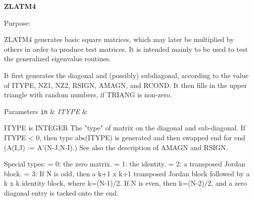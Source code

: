 {\bfseries Z\+L\+A\+T\+M4} 

\begin{DoxyParagraph}{Purpose\+: }
\begin{DoxyVerb} ZLATM4 generates basic square matrices, which may later be
 multiplied by others in order to produce test matrices.  It is
 intended mainly to be used to test the generalized eigenvalue
 routines.

 It first generates the diagonal and (possibly) subdiagonal,
 according to the value of ITYPE, NZ1, NZ2, RSIGN, AMAGN, and RCOND.
 It then fills in the upper triangle with random numbers, if TRIANG is
 non-zero.\end{DoxyVerb}
 
\end{DoxyParagraph}

\begin{DoxyParams}[1]{Parameters}
\mbox{\tt in}  & {\em I\+T\+Y\+P\+E} & \begin{DoxyVerb}          ITYPE is INTEGER
          The "type" of matrix on the diagonal and sub-diagonal.
          If ITYPE < 0, then type abs(ITYPE) is generated and then
             swapped end for end (A(I,J) := A'(N-J,N-I).)  See also
             the description of AMAGN and RSIGN.

          Special types:
          = 0:  the zero matrix.
          = 1:  the identity.
          = 2:  a transposed Jordan block.
          = 3:  If N is odd, then a k+1 x k+1 transposed Jordan block
                followed by a k x k identity block, where k=(N-1)/2.
                If N is even, then k=(N-2)/2, and a zero diagonal entry
                is tacked onto the end.


\end{DoxyVerb}
\end{DoxyParams}
